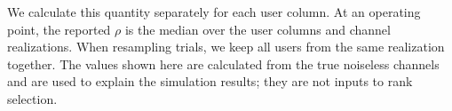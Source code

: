 
We calculate this quantity separately for each user column. At an
operating point, the reported $\rho$ is the median over the user columns
and channel realizations. When resampling trials, we keep all users from
the same realization together. The values shown here are calculated from
the true noiseless channels and are used to explain the simulation results;
they are not inputs to rank selection.
